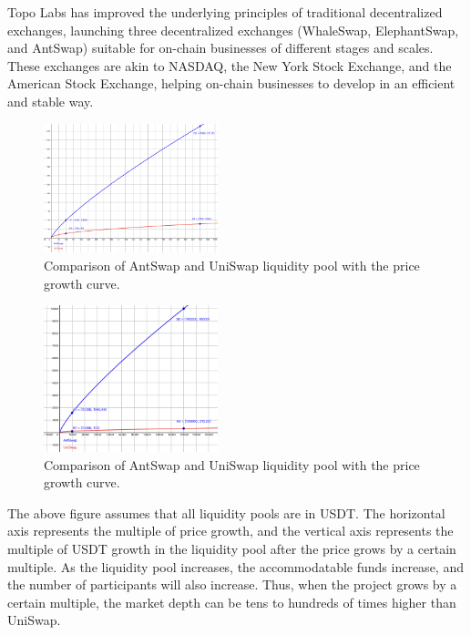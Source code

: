 \documentclass{article}
\begin{document}
Topo Labs has improved the underlying principles of traditional decentralized exchanges, launching three decentralized exchanges (WhaleSwap, ElephantSwap, and AntSwap) suitable for on-chain businesses of different stages and scales. These exchanges are akin to NASDAQ, the New York Stock Exchange, and the American Stock Exchange, helping on-chain businesses to develop in an efficient and stable way.

\begin{figure}
\centering
\includegraphics[width=0.45\textwidth]{./img/antswap_uniswap_1.png}
\caption{\label{fig}Comparison of AntSwap and UniSwap liquidity pool with the price growth curve.}
\end{figure}

\begin{figure}
\centering
\includegraphics[width=0.45\textwidth]{./img/antswap_uniswap_2.png}
\caption{\label{fig}Comparison of AntSwap and UniSwap liquidity pool with the price growth curve.}
\end{figure}

The above figure assumes that all liquidity pools are in USDT. The horizontal axis represents the multiple of price growth, and the vertical axis represents the multiple of USDT growth in the liquidity pool after the price grows by a certain multiple. As the liquidity pool increases, the accommodatable funds increase, and the number of participants will also increase. Thus, when the project grows by a certain multiple, the market depth can be tens to hundreds of times higher than UniSwap.
\end{document}
